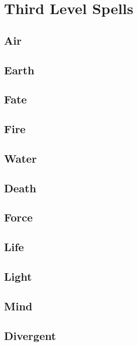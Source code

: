 \section{Third Level Spells}

\begin{multicols}{2}

\subsection{Air}


\subsection{Earth}


\subsection{Fate}


\subsection{Fire}

\subsection{Water}

\subsection{Death}


\subsection{Force}


\subsection{Life}


\subsection{Light}


\subsection{Mind}


\subsection{Divergent}



\end{multicols}

